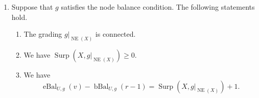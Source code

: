 \begin{lemma}
\begin{enumerate}
\begin{enumerate}[label=(\alph*),ref=\theenumi(\alph*)]
\item\label{c:node-boundary-balances} For every $i\in[r,s]_{\Z}$, we have
\[
 \operatorname{bBal}_{U,g}(i)\ge\operatorname{eBal}_{U,g}(x).
\]
\item\label{c:node-descendant-balances} Let $y\in E(U)$ be such that
$\operatorname{Node}_{U,g}(y)\subsetneq X$.
Then, $\operatorname{eBal}_{U,g}(y)>\operatorname{eBal}_{U,g}(x)$.
\end{enumerate}
\item\label{c:node-residual} Suppose that $g$ satisfies the node balance condition. The following statements hold.
\begin{enumerate}[label=(\alph*),ref=\theenumi(\alph*)]
\item\label{c:node-restricted-connected} The grading $g|_{\operatorname{NE}(X)}$ is connected.
\item\label{c:node-residual-nonnegative} We have
$\operatorname{Surp}(X,g|_{\operatorname{NE}(X)})\ge0$.
\item\label{c:node-residual-identity} We have
\begin{equation}\label{eq:node-surplus-balance}
 \operatorname{eBal}_{U,g}(v)
 -\operatorname{bBal}_{U,g}(r-1)
 =\operatorname{Surp}(X,g|_{\operatorname{NE}(X)})+1.
\end{equation}
\end{enumerate}
\end{enumerate}
\end{lemma}
